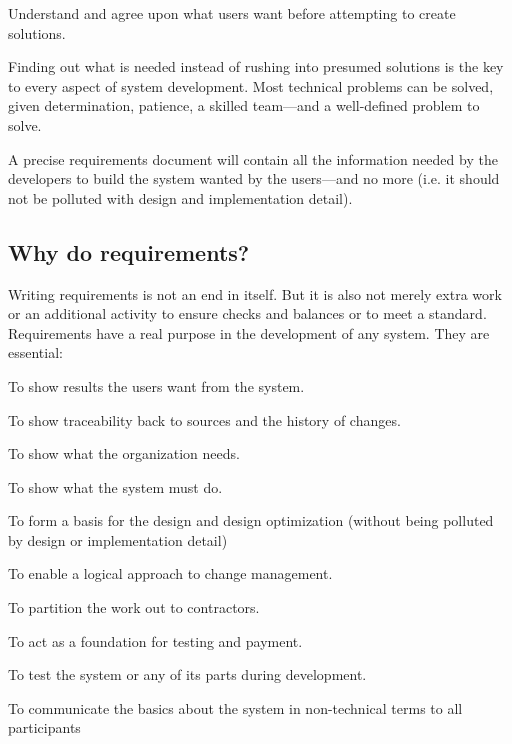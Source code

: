 \begin{mdframed}
Understand and agree upon what users want before attempting to create
solutions.
\end{mdframed}

Finding out what is needed instead of rushing into presumed solutions is the key
to every aspect of system development. Most technical problems can be solved,
given determination, patience, a skilled team---and a well-defined problem to
solve.

\bigskip
\begin{mdframed}
A precise requirements document will contain all the information needed by the developers to build the system wanted by the users---and no more (i.e. it should not be polluted with design and implementation detail).
\end{mdframed}


\subsection{Why do requirements?}
Writing requirements is not an end in itself. But it is also not merely extra work or an
additional activity to ensure checks and balances or to meet a standard.
Requirements have a real purpose in the development of any system.
They are essential:
\begin{mylist}
\item To show results the users want from the system.
\item  To show traceability back to sources and the history of changes.
\item  To show what the organization needs.
\item  To show what the system must do.
\item  To form a basis for the design and design optimization (without being polluted by design or implementation detail)
\item  To enable a logical approach to change management.
\item  To partition the work out to contractors.
\item  To act as a foundation for testing and payment.
\item  To test the system or any of its parts during development.
\item  To communicate the basics about the system in non-technical terms to all
participants
\end{mylist}


